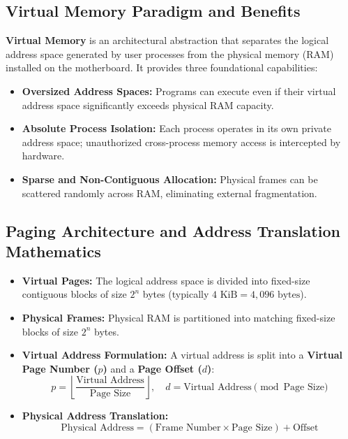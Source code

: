 \subsection{Virtual Memory Paradigm and Benefits}
\textbf{Virtual Memory} is an architectural abstraction that separates the logical address space generated by user processes from the physical memory (RAM) installed on the motherboard. It provides three foundational capabilities:
\begin{itemize}
    \item \textbf{Oversized Address Spaces:} Programs can execute even if their virtual address space significantly exceeds physical RAM capacity.
    \item \textbf{Absolute Process Isolation:} Each process operates in its own private address space; unauthorized cross-process memory access is intercepted by hardware.
    \item \textbf{Sparse and Non-Contiguous Allocation:} Physical frames can be scattered randomly across RAM, eliminating external fragmentation.
\end{itemize}

\subsection{Paging Architecture and Address Translation Mathematics}
\begin{itemize}
    \item \textbf{Virtual Pages:} The logical address space is divided into fixed-size contiguous blocks of size $2^n$ bytes (typically $4\text{ KiB} = 4,096\text{ bytes}$).
    \item \textbf{Physical Frames:} Physical RAM is partitioned into matching fixed-size blocks of size $2^n$ bytes.
    \item \textbf{Virtual Address Formulation:} A virtual address is split into a \textbf{Virtual Page Number ($p$)} and a \textbf{Page Offset ($d$)}:
    \begin{equation}
    p = \left\lfloor \frac{\text{Virtual Address}}{\text{Page Size}} \right\rfloor, \quad d = \text{Virtual Address} \pmod{\text{Page Size}}
    \end{equation}
    \item \textbf{Physical Address Translation:}
    \begin{equation}
    \boxed{\text{Physical Address} = (\text{Frame Number} \times \text{Page Size}) + \text{Offset}}
    \end{equation}
\end{itemize}

